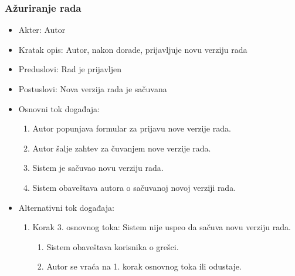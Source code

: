 \documentclass[a4paper]{article}
\begin{document}
\subsubsection{Ažuriranje rada}
\label{subsubsection:azuriranje}
\begin{itemize}
    \item Akter: Autor
    \item Kratak opis: Autor, nakon dorade, prijavljuje novu verziju rada
    \item Preduslovi: Rad je prijavljen
    \item Postuslovi: Nova verzija rada je sačuvana
    \item Osnovni tok događaja:
        \begin{enumerate}
           \item Autor popunjava formular za prijavu nove verzije rada.
           \item Autor šalje zahtev za čuvanjem nove verzije rada.
           \item Sistem je sačuvao novu verziju rada.
           \item Sistem obaveštava autora o sačuvanoj novoj verziji rada.
        \end{enumerate}
    \item Alternativni tok događaja:
        \begin{enumerate}
            \item Korak 3. osnovnog toka: Sistem nije uspeo da sačuva novu verziju rada.
            \begin{enumerate}
                \item Sistem obaveštava korisnika o grešci.
                \item Autor se vraća na 1. korak osnovnog toka ili odustaje.
            \end{enumerate}
        \end{enumerate}
\end{itemize}

\newpage
\end{document}

